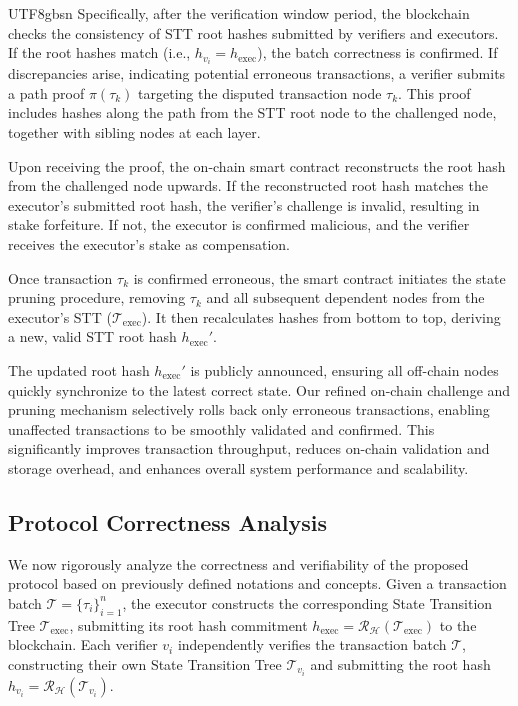 \documentclass[runningheads]{llncs}
\begin{document}
\begin{CJK*}{UTF8}{gbsn}
Specifically, after the verification window period, the blockchain checks the consistency of STT root hashes submitted by verifiers and executors. If the root hashes match (i.e., $h_{v_i}=h_{\text{exec}}$), the batch correctness is confirmed. If discrepancies arise, indicating potential erroneous transactions, a verifier submits a path proof $\pi(\tau_k)$ targeting the disputed transaction node $\tau_k$. This proof includes hashes along the path from the STT root node to the challenged node, together with sibling nodes at each layer.

Upon receiving the proof, the on-chain smart contract reconstructs the root hash from the challenged node upwards. If the reconstructed root hash matches the executor's submitted root hash, the verifier's challenge is invalid, resulting in stake forfeiture. If not, the executor is confirmed malicious, and the verifier receives the executor's stake as compensation.

Once transaction $\tau_k$ is confirmed erroneous, the smart contract initiates the state pruning procedure, removing $\tau_k$ and all subsequent dependent nodes from the executor's STT ($\mathcal{T}_{\text{exec}}$). It then recalculates hashes from bottom to top, deriving a new, valid STT root hash $h_{\text{exec}}'$.

The updated root hash $h_{\text{exec}}'$ is publicly announced, ensuring all off-chain nodes quickly synchronize to the latest correct state. Our refined on-chain challenge and pruning mechanism selectively rolls back only erroneous transactions, enabling unaffected transactions to be smoothly validated and confirmed. This significantly improves transaction throughput, reduces on-chain validation and storage overhead, and enhances overall system performance and scalability.


\subsection{Protocol Correctness Analysis}

We now rigorously analyze the correctness and verifiability of the proposed protocol based on previously defined notations and concepts. Given a transaction batch $\mathcal{T}=\{\tau_i\}_{i=1}^{n}$, the executor constructs the corresponding State Transition Tree $\mathcal{T}_{\text{exec}}$, submitting its root hash commitment $h_{\text{exec}}=\mathcal{R_H}(\mathcal{T}_{\text{exec}})$ to the blockchain. Each verifier $v_i$ independently verifies the transaction batch $\mathcal{T}$, constructing their own State Transition Tree $\mathcal{T}_{v_i}$ and submitting the root hash $h_{v_i}=\mathcal{R_H}(\mathcal{T}_{v_i})$.


\end{CJK*}
\end{document}
